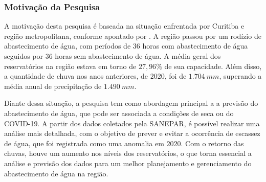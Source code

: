       
\subsubsection{Motiva\c c\~ao da Pesquisa} \label{subsubsec:motivacao}
 
 
 	A motivação desta pesquisa é baseada na situação enfrentada por Curitiba e região metropolitana, conforme apontado por . A região passou por um rodízio de abastecimento de água, com períodos de 36 horas com abastecimento de água seguidos por 36 horas sem abastecimento de água. A média geral dos reservatórios na região estava em torno de $27,96\%$ de sua capacidade. Além disso, a quantidade de chuva nos anos anteriores, de $2020$, foi de $1.704 \ mm$, superando a média anual de precipitação de $1.490 \ mm$.
 	
 	Diante dessa situação, a pesquisa tem como abordagem principal a a previsão do abastecimento de água, que pode ser associada a condições de seca ou do COVID-19. A partir dos dados coletados pela SANEPAR, é possível realizar uma análise mais detalhada, com o objetivo de prever e evitar a ocorrência de escassez de água, que foi registrada como uma anomalia em $2020$. Com o retorno das chuvas, houve um aumento nos níveis dos reservatórios, o que torna essencial a análise e previsão dos dados para um melhor planejamento e gerenciamento do abastecimento de água na região.
    
     
    